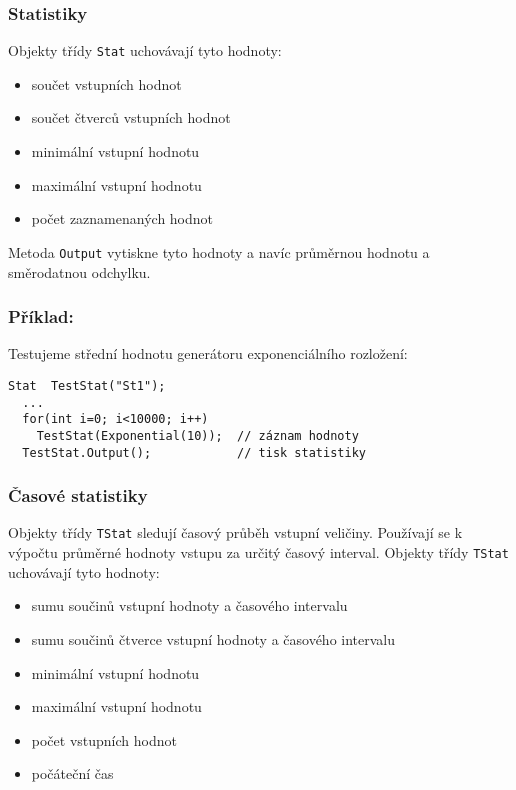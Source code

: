 \documentclass[a4paper]{article}
\begin{document}
\subsubsection{Statistiky}

Objekty třídy  \verb|Stat|  uchovávají tyto hodnoty:

\begin{itemize}
\item součet vstupních hodnot
\item součet čtverců vstupních hodnot
\item minimální vstupní hodnotu
\item maximální vstupní hodnotu
\item počet zaznamenaných hodnot
\end{itemize}

Metoda \verb|Output| vytiskne tyto hodnoty a navíc průměrnou hodnotu
a směrodatnou odchylku.

\subsubsection*{Příklad:}

Testujeme střední hodnotu generátoru exponenciálního rozložení:

\begin{verbatim}
Stat  TestStat("St1");
  ...
  for(int i=0; i<10000; i++)
    TestStat(Exponential(10));  // záznam hodnoty
  TestStat.Output();            // tisk statistiky

\end{verbatim}

\subsubsection{Časové statistiky}

Objekty třídy \verb|TStat| sledují časový průběh vstupní veličiny.
Používají se k výpočtu průměrné hodnoty vstupu za určitý časový
interval. Objekty třídy \verb|TStat| uchovávají tyto hodnoty:

\begin{itemize}
\item sumu součinů vstupní hodnoty a časového intervalu
\item sumu součinů čtverce vstupní hodnoty a časového intervalu
\item minimální vstupní hodnotu
\item maximální vstupní hodnotu
\item počet vstupních hodnot
\item počáteční čas
\end{itemize}
\end{document}
